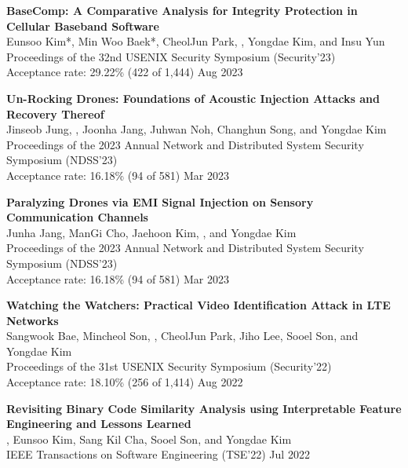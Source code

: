 \begin{enumerate}[label={[\arabic*]}, leftmargin=1.5em]
    \item \textbf{BaseComp: A Comparative Analysis for Integrity Protection
    in Cellular Baseband Software} \\
        {\small
            Eunsoo Kim*, Min Woo Baek*, CheolJun Park, , Yongdae Kim, and Insu Yun \\
            Proceedings of the 32nd USENIX Security Symposium (Security'23) \\
            Acceptance rate: 29.22\% (422 of 1,444)
        }
    \hfill {\small Aug 2023}
    
    \item \textbf{Un-Rocking Drones: Foundations of Acoustic
Injection Attacks and Recovery Thereof} \\
        {\small
            Jinseob Jung, , Joonha Jang, Juhwan Noh, Changhun Song, and Yongdae Kim \\
            Proceedings of the 2023 Annual Network and Distributed System Security Symposium (NDSS'23) \\  
            Acceptance rate: 16.18\% (94 of 581)
        }
    \hfill {\small Mar 2023}

    \item \textbf{Paralyzing Drones via EMI Signal Injection on
Sensory Communication Channels} \\
        {\small
            Junha Jang, ManGi Cho, Jaehoon Kim, , and Yongdae Kim \\
            Proceedings of the 2023 Annual Network and Distributed System Security Symposium (NDSS'23) \\ 
            Acceptance rate: 16.18\% (94 of 581)
        }
    \hfill {\small Mar 2023}

    \item \textbf{Watching the Watchers: Practical Video Identification Attack
    in LTE Networks} \\
        {\small
            Sangwook Bae, Mincheol Son, , CheolJun Park, Jiho Lee, Sooel Son, and Yongdae Kim \\
            Proceedings of the 31st USENIX Security Symposium (Security'22) \\
            Acceptance rate: 18.10\% (256 of 1,414)
        }
    \hfill {\small Aug 2022}

    \item \textbf{Revisiting Binary Code Similarity Analysis using Interpretable Feature Engineering and Lessons Learned} \\
        {\small
            , Eunsoo Kim, Sang Kil Cha, Sooel Son, and Yongdae Kim \\
            IEEE Transactions on Software Engineering
            (TSE'22)
        }
    \hfill {\small Jul 2022}


\end{enumerate}

